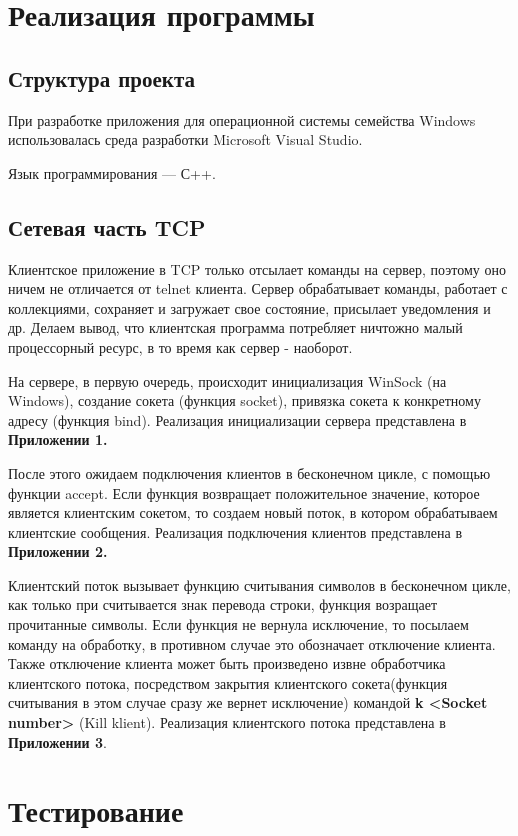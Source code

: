 \documentclass[a4paper,14pt]{article}
\begin{document}
\section{Реализация программы}
\subsection{Структура проекта}
При разработке приложения для операционной системы семейства Windows использовалась среда разработки Microsoft Visual Studio.

Язык программирования — С++.

\subsection{Сетевая часть TCP}
Клиентское приложение в TCP только отсылает команды на сервер, поэтому оно ничем не отличается от telnet клиента. Сервер обрабатывает команды, работает с коллекциями, сохраняет и загружает свое состояние, присылает уведомления и др. Делаем вывод, что клиентская программа потребляет ничтожно малый процессорный ресурс, в то время как сервер - наоборот.

На сервере, в первую очередь, происходит инициализация WinSock (на Windows), создание сокета (функция socket), привязка сокета к конкретному адресу (функция bind). Реализация инициализации сервера представлена в \textbf{Приложении 1.}

После этого ожидаем подключения клиентов в бесконечном цикле, с помощью функции accept. Если функция возвращает положительное значение, которое является клиентским сокетом, то создаем новый поток, в котором обрабатываем клиентские сообщения. Реализация подключения клиентов представлена в \textbf{Приложении 2.}

Клиентский поток вызывает функцию считывания символов в бесконечном цикле, как только при считывается знак перевода строки, функция возращает прочитанные символы. Если функция не вернула исключение, то посылаем команду на обработку, в противном случае это обозначает отключение клиента. Также отключение клиента может быть произведено извне обработчика клиентского потока, посредством закрытия клиентского сокета(функция считывания в этом случае сразу же вернет исключение) командой \textbf{k <Socket number>} (Kill klient). Реализация клиентского потока
представлена в \textbf{Приложении 3}.

\section{Тестирование}
\end{document}
